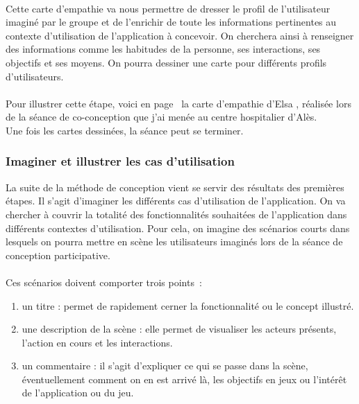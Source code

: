 \paragraph{} Cette carte d'empathie va nous permettre de dresser le profil de l'utilisateur imaginé par le groupe et de l'enrichir de toute les informations pertinentes au contexte d'utilisation de l'application à concevoir. On cherchera ainsi à renseigner des informations comme les habitudes de la personne, ses interactions, ses objectifs et ses moyens. On pourra dessiner une carte pour différents profils d'utilisateurs.

\paragraph{} Pour illustrer cette étape, voici en page~\pageref{empathie_elsa} la carte d'empathie d'Elsa , réalisée lors de la séance de co-conception que j'ai menée au centre hospitalier d'Alès. \\
Une fois les cartes dessinées, la séance peut se terminer.


\label{empathie_elsa}
	
	\subsubsection*{Imaginer et illustrer les cas d'utilisation}
La suite de la méthode de conception vient se servir des résultats des premières étapes. Il s'agit d'imaginer les différents cas d'utilisation de l'application. On va chercher à couvrir la totalité des fonctionnalités souhaitées de l'application dans différents contextes d'utilisation. Pour cela, on imagine des scénarios courts dans lesquels on pourra mettre en scène les utilisateurs imaginés lors de la séance de conception participative.

\paragraph{}Ces scénarios doivent comporter trois points~:
\begin{enumerate}
	\item un titre : permet de rapidement cerner la fonctionnalité ou le concept illustré.
	\item une description de la scène : elle permet de visualiser les acteurs présents, l'action en cours et les interactions.
	\item un commentaire : il s'agit d'expliquer ce qui se passe dans la scène, éventuellement comment on en est arrivé là, les objectifs en jeux ou l'intérêt de l'application ou du jeu.
\end{enumerate}

